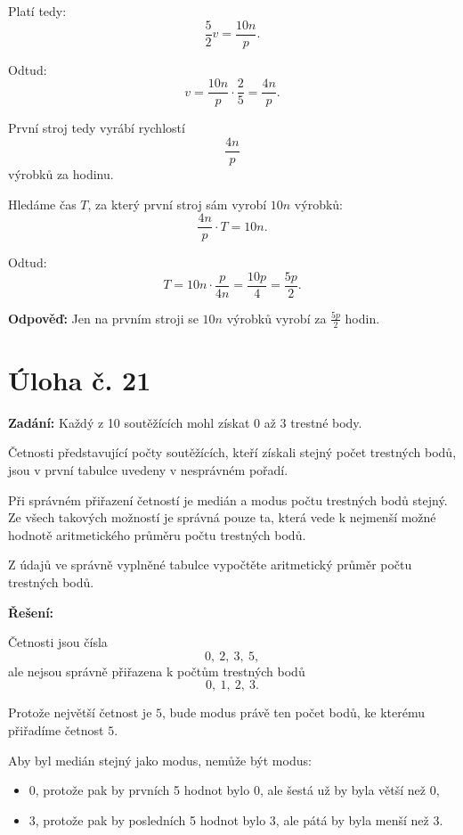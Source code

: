 \documentclass[12pt,a4paper]{article}
\begin{document}
Platí tedy:
\[
\frac52v=\frac{10n}{p}.
\]

Odtud:
\[
v=\frac{10n}{p}\cdot\frac{2}{5}=\frac{4n}{p}.
\]

První stroj tedy vyrábí rychlostí
\[
\frac{4n}{p}
\]
výrobků za hodinu.

Hledáme čas \(T\), za který první stroj sám vyrobí \(10n\) výrobků:
\[
\frac{4n}{p}\cdot T=10n.
\]

Odtud:
\[
T=10n\cdot\frac{p}{4n}=\frac{10p}{4}=\frac{5p}{2}.
\]

\bigskip

\textbf{Odpověď:}  
Jen na prvním stroji se \(10n\) výrobků vyrobí za \(\frac{5p}{2}\) hodin.



\newpage
\section*{Úloha č. 21}

\textbf{Zadání:}  
Každý z 10 soutěžících mohl získat 0 až 3 trestné body.

Četnosti představující počty soutěžících, kteří získali stejný počet trestných bodů, jsou v první tabulce uvedeny v nesprávném pořadí.

Při správném přiřazení četností je medián a modus počtu trestných bodů stejný.  
Ze všech takových možností je správná pouze ta, která vede k nejmenší možné hodnotě aritmetického průměru počtu trestných bodů.

Z údajů ve správně vyplněné tabulce vypočtěte aritmetický průměr počtu trestných bodů.

\bigskip

\textbf{Řešení:}

Četnosti jsou čísla
\[
0,\ 2,\ 3,\ 5,
\]
ale nejsou správně přiřazena k počtům trestných bodů
\[
0,\ 1,\ 2,\ 3.
\]

Protože největší četnost je \(5\), bude modus právě ten počet bodů, ke kterému přiřadíme četnost \(5\).

\medskip

Aby byl medián stejný jako modus, nemůže být modus:
\begin{itemize}
    \item \(0\), protože pak by prvních 5 hodnot bylo \(0\), ale šestá už by byla větší než 0,
    \item \(3\), protože pak by posledních 5 hodnot bylo \(3\), ale pátá by byla menší než 3.
\end{itemize}
\end{document}
